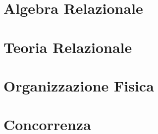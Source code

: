 \documentclass{article}
\begin{document}
\section{Algebra Relazionale}

\section{Teoria Relazionale}

\section{Organizzazione Fisica}

\section{Concorrenza} \label{sec:concorrenza}
\end{document}
